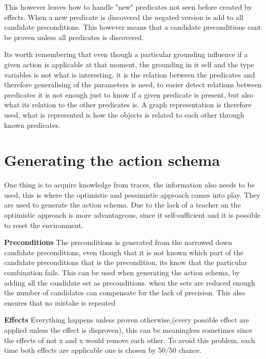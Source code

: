 	This however leaves how to handle "new" predicates not seen before created by effects. When a new predicate is discovered the negated version is add to all candidate preconditions. This however means that a candidate preconditions cant be proven unless all predicates is discovered. 


	Its worth remembering that even though a particular grounding influence if a given action is applicable at that moment, the grounding in it self and the type variables is not what is interesting, it is the relation between the predicates and therefore generalising of the parameters is need, to easier detect relations between predicates it is not enough just to know if a given predicate is present, but also what its relation to the other predicates is. A graph representation is therefore used, what is represented is how the objects is related to each other through known predicates.


\section{Generating the action schema}
One thing is to acquire knowledge from traces, the information also needs to be used, this is where the optimistic and pessimistic approach comes into play. They are used to generate the action schema. Due to the lack of a teacher an the optimistic approach is more advantageous, since it self-sufficient and it is possible to reset the environment.


\textbf{Preconditions}
The preconditions is generated from the narrowed down candidate preconditions, even though that it is not known which part of the candidate preconditions that is the precondition, its know that the particular combination fails. This can be used when generating the action schema, by adding all the candidate set as preconditions. when the sets are reduced enough the number of candidates can compensate for the lack of precision. This also ensures that no mistake is repeated


\textbf{Effects}
Everything happens unless proven otherwise,(every possible effect are applied unless the effect is disproven), this can be meaningless sometimes since the effects of not x and x would remove each other. To avoid this problem, each time both effects are applicable one is chosen by 50/50 chance.
